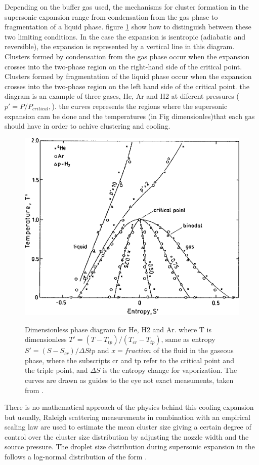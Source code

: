 Depending on the buffer gas used, the mechanisms for cluster formation in the supersonic expansion range from condensation from the gas phase to fragmentation of a liquid phase. figure \ref{img:t-s_He} show how to distinguish between these two limiting conditions. In the case the expansion is isentropic (adiabatic and reversible), the expansion is represented by a vertical line in this diagram. Clusters formed by condensation from the gas phase occur when the expansion crosses into the two-phase region on the right-hand side of the critical point. Clusters formed by fragmentation of the liquid phase occur when the expansion crosses into the two-phase region on the left hand side of the critical point. the diagram is an example of three gases, He, Ar and H2 at diferent pressures ($p'=P/P_{critical},$)\cite{knuth_average_1999}. the curves represents the regions where the supersonic expansion cam be done and the temperatures (in Fig dimensionles)that each gas should have in order to achive clustering and cooling.\cite{knuth_average_1999}

\begin{figure}[hbtp]
 \centering
  \includegraphics[width= 8 cm]{../Images/dimensiones isentropic diagram.png}
 \label{img:t-s_He}
 \caption{Dimensionless phase diagram for He, H2 and Ar. where T is
dimensionless $T'=(T -T_{tp})/(T_{cr}-T_{tp})$, same as entropy $S'=(S-S_{cr})/\Delta Stp$ and $x=fraction$ of
the fluid in the gaseous phase, where the subscripts cr and tp refer to the
critical point and the triple point, and $\Delta S$ is the entropy change for vaporization. The curves are
drawn as guides to the eye not exact measuments, taken from \cite{knuth_average_1999}.}
 \end{figure}
  

There is no mathematical approach of the physics behind this cooling expansion but usually, Raleigh scattering measurements in combination with an empirical scaling law \cite{hagena_cluster_1972} are used to estimate the mean cluster size giving a certain degree of control over the cluster size distribution by adjusting the nozzle width and the source pressure. The droplet size distribution during supersonic expansion in the follows a log-normal distribution of the form \cite{harms_density_1998}.

